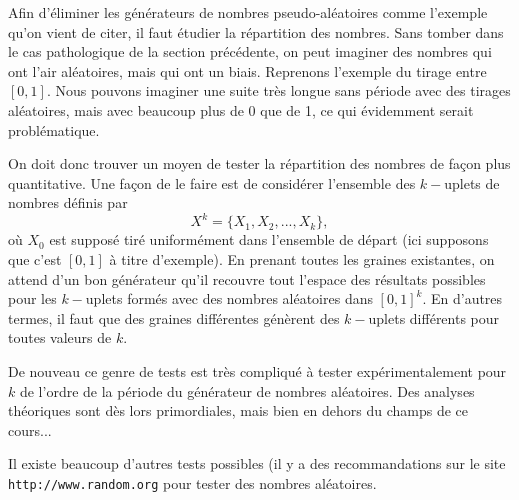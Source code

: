 \documentclass[a4paper,12pt]{book}
\begin{document}
Afin d'éliminer les générateurs de nombres pseudo-aléatoires comme l'exemple qu'on 
vient de citer, il faut étudier la répartition des nombres. Sans tomber dans le cas pathologique de la section
précédente, on peut imaginer des nombres qui ont l'air aléatoires, mais qui ont un biais. 
Reprenons l'exemple du tirage entre $[0,1]$. Nous pouvons imaginer une suite très longue 
sans période avec des tirages aléatoires, mais avec beaucoup plus de 0 que de 1, ce qui évidemment serait problématique.

On doit donc trouver un moyen de tester la répartition des nombres de façon plus quantitative.
Une façon de le faire est de considérer l'ensemble des $k-$uplets de nombres définis par
\begin{equation}
 X^k=\{X_1,X_2, ..., X_k\},
\end{equation}
où $X_0$ est supposé tiré uniformément dans l'ensemble de départ (ici supposons que c'est $[0,1]$ à titre d'exemple).
En prenant toutes les graines existantes, on attend d'un bon générateur qu'il recouvre tout l'espace des résultats possibles
pour les $k-$uplets formés avec des nombres aléatoires dans $[0,1]^k$. En d'autres termes, il faut que des graines différentes
génèrent des $k-$uplets différents pour toutes valeurs de $k$. 

De nouveau ce genre de tests est très compliqué à tester expérimentalement pour $k$ de l'ordre de la période 
du générateur de nombres aléatoires. Des analyses théoriques sont dès lors primordiales, mais bien en dehors 
du champs de ce cours...

Il existe beaucoup d'autres tests possibles (il y a des recommandations sur le site \texttt{http://www.random.org} 
pour tester des nombres aléatoires. 
\end{document}
